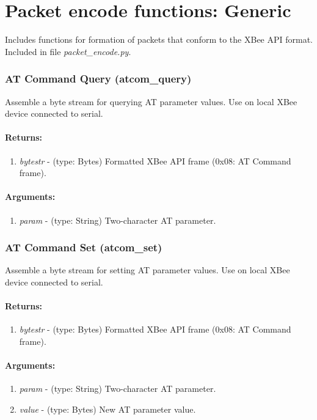 \part{Packet encode functions: Generic}

Includes functions for formation of packets that conform to the XBee API format. Included in file \emph{packet\_encode.py}.

\section{AT Command Query (atcom\_query)}
Assemble a byte stream for querying AT parameter values. Use on local XBee device connected to serial.
\subsection{Returns:}
\begin{enumerate}
\item \emph{bytestr} - (type: Bytes) Formatted XBee API frame (0x08: AT Command frame).
\end{enumerate}
\subsection{Arguments:}
\begin{enumerate}
\item \emph{param} - (type: String) Two-character AT parameter. 
\end{enumerate}

\section{AT Command Set (atcom\_set)}
Assemble a byte stream for setting AT parameter values. Use on local XBee device connected to serial.
\subsection{Returns:}
\begin{enumerate}
\item \emph{bytestr} - (type: Bytes) Formatted XBee API frame (0x08: AT Command frame).
\end{enumerate}
\subsection{Arguments:}
\begin{enumerate}
\item \emph{param} - (type: String) Two-character AT parameter.
\item \emph{value} - (type: Bytes) New AT parameter value.
\end{enumerate}

